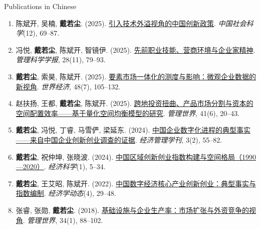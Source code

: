 \documentclass{resume} %
\begin{document}
\begin{rSection}{Publications in Chinese}
\begin{enumerate}
\item 陈斌开, 吴楠, \textbf{戴若尘}. (2025). \href{https://ruochendai-econ.github.io/papers/innovation-policy.pdf}{引入技术外溢视角的中国创新政策}. \emph{中国社会科学}(12), 69--87.

\item 冯悦, \textbf{戴若尘}, 陈斌开, 智镜伊. (2025). \href{https://ruochendai-econ.github.io/papers/skills-entrepreneurship.pdf}{先前职业技能、营商环境与企业家精神}. \emph{管理科学学报}, 28(11), 79--93.

\item \textbf{戴若尘}, 索昊, 陈斌开. (2025). \href{https://ruochendai-econ.github.io/papers/factor-market-integration.pdf}{要素市场一体化的测度与影响：微观企业数据的新视角}. \emph{世界经济}, 48(7), 105--132.

\item 赵扶扬, 王都, \textbf{戴若尘}, 陈斌开. (2025). \href{https://ruochendai-econ.github.io/papers/spatial-capital-allocation.pdf}{跨地投资扭曲、产品市场分割与资本的空间配置效率------基于量化空间均衡模型的研究}. \emph{管理世界}, 41(6), 20--43.

\item \textbf{戴若尘}, 冯悦, 丁睿, 马雪俨, 梁延东. (2024). \href{https://ruochendai-econ.github.io/papers/firm-digitalization.pdf}{中国企业数字化进程的典型事实------来自中国企业创新创业调查的证据}. \emph{经济管理学刊}, 3(2), 55--82.

\item \textbf{戴若尘}, 祝仲坤, 张晓波. (2024). \href{https://ruochendai-econ.github.io/papers/regional-entrepreneurship-index.pdf}{中国区域创新创业指数构建与空间格局（1990---2020）}. \emph{经济科学}(1), 5--34.

\item \textbf{戴若尘}, 王艾昭, 陈斌开. (2022). \href{https://ruochendai-econ.github.io/papers/digital-economy-index.pdf}{中国数字经济核心产业创新创业：典型事实与指数编制}. \emph{经济学动态}(4), 29--48.

\item 张睿, 张勋, \textbf{戴若尘}. (2018). \href{https://ruochendai-econ.github.io/papers/infrastructure-productivity.pdf}{基础设施与企业生产率：市场扩张与外资竞争的视角}. \emph{管理世界}, 34(1), 88--102.
\end{enumerate}
\end{rSection}
\end{document}
